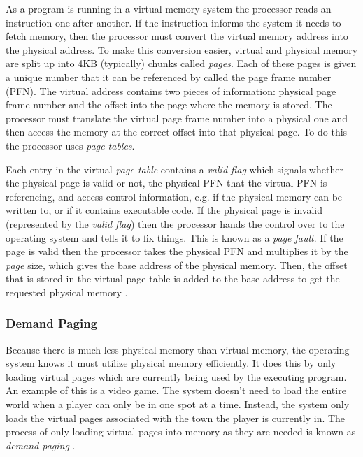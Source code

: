 \documentclass[onecolumn,draftclsnofoot, 10pt, compsoc]{IEEEtran}
\begin{document}
			As a program is running in a virtual memory system the processor reads an instruction one after another.
			If the instruction informs the system it needs to fetch memory, then the processor must convert the virtual memory address into the physical address.
			To make this conversion easier, virtual and physical memory are split up into 4KB (typically) chunks called \textit{pages}.
			Each of these pages is given a unique number that it can be referenced by called the page frame number (PFN).
			The virtual address contains two pieces of information: physical page frame number and the offset into the page where the memory is stored.
			The processor must translate the virtual page frame number into a physical one and then access the memory at the correct offset into that physical page. To do this the processor uses \textit{page tables}.
	
			Each entry in the virtual \textit{page table}  contains a \textit{valid flag} which signals whether the physical page is valid or not, the physical PFN that the virtual PFN is referencing, and access control information, e.g. if the physical memory can be written to, or if it contains executable code.	
			If the physical page is invalid (represented by the \textit{valid flag}) then the processor hands the control over to the operating system and tells it to fix things.
			This is known as a \textit{page fault}.
			If the page is valid then the processor takes the physical PFN and multiplies it by the \textit{page} size, which gives the base address of the physical memory.
			Then, the offset that is stored in the virtual page table is added to the base address to get the requested physical memory \cite{linuxMM}.
	
		\subsubsection{Demand Paging}
			Because there is much less physical memory than virtual memory, the operating system knows it must utilize physical memory efficiently.
			It does this by only loading virtual pages which are currently being used by the executing program.
			An example of this is a video game.
			The system doesn't need to load the entire world when a player can only be in one spot at a time.
			Instead, the system only loads the virtual pages associated with the town the player is currently in. The process of only loading virtual pages into memory as they are needed is known as \textit{demand paging} \cite{linuxMM}.
	
\end{document}
